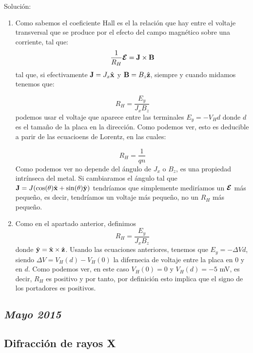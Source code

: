 Solución:

\begin{enumerate}[label=\alph*)]
	\item Como sabemos el coeficiente Hall es el la relación que hay entre el voltaje transversal que se produce por el efecto del campo magnético sobre una corriente, tal que:
	      \[
		      \frac{1}{R_H}\boldsymbol{\mathcal{E}}  = \mathbf{J} \times \mathbf{B}
	      \]
	      tal que, si efectivamente $\mathbf{J} = J_x \hat{\mathbf{x}} $ y $\mathbf{B} = B_z \hat{\mathbf{z}}$, siempre y cuando midamos  tenemos que:

	      \[
		      R_H = \frac{E_y}{J_x B_z}
	      \]
	      podemos usar el voltaje que aparece entre las terminales $E_y = - V_H d$ donde $d$ es el tamaño de la placa en la dirección. Como podemos ver, esto es deducible a parir de las ecuacioens de Lorentz, en las cuales:

	      \[
		      R_H = \frac{1}{qn}
	      \]
	      Como podemos ver no depende del ángulo de $J_x$ o $B_z$, es una propiedad intrínseca del metal. Si cambiaramos el ángulo tal que $\mathbf{J} = J (\cos (\theta) \hat{\mathbf{x}} + \sin (\theta) \hat{\mathbf{y}})$  tendríamos que simplemente mediríamos un $\boldsymbol{\mathcal{E}}$ más pequeño, es decir, tendríamos un voltaje más pequeño, no un $R_H$ más pequeño.


	\item Como en el apartado anterior, definimos
	      \[
		      R_H = \frac{E_y}{J_x B_z}
	      \]
	      donde $\hat{\mathbf{y}} = \hat{\mathbf{x}} \times \hat{\mathbf{z}}$. Usando las ecuaciones anteriores, tenemos que $E_y = - \Delta V d$, siendo $\Delta V = V_H(d)-V_H(0)$ la difernecia de voltaje entre la placa en $0$ y en $d$. Como podemos ver, en este caso $V_H(0)=0$ y $V_H(d)=-5$ mV, es decir, $R_H$ es positivo y por tanto, por definición esto implica que el signo de los portadores es positivos.


\end{enumerate}

\newpage

\subsection*{\textit{Mayo 2015}}

\begin{Enunciado}
	\subsection*{Difracción de rayos X}
	\lipsum[1]
\end{Enunciado}

